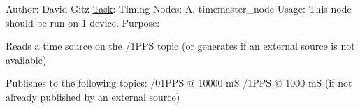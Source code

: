 Author\+: David Gitz \hyperlink{structTask}{Task}\+: Timing Nodes\+: A. timemaster\+\_\+node Usage\+: This node should be run on 1 device. Purpose\+:
\begin{DoxyEnumerate}
\item Reads a time source on the /1\+P\+PS topic (or generates if an external source is not available)
\item Publishes to the following topics\+: /01\+P\+PS @ 10000 mS /1\+P\+PS @ 1000 mS (if not already published by an external source) 
\end{DoxyEnumerate}
